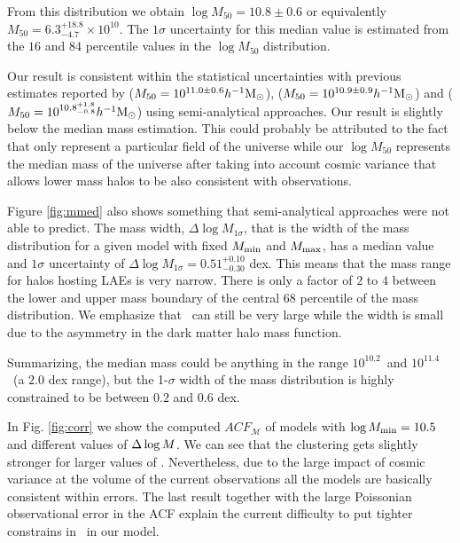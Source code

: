 \documentclass{emulateapj}
\newcommand{\hMsun}{{\ifmmode{h^{-1}{\rm {M_{\odot}}}}\else{$h^{-1}{\rm{M_{\odot}}}$}\fi}}
\newcommand{\mmin}{{\ifmmode{{M_{\rm min}}}\else{${M_{\rm min}}$}\fi}}
\newcommand{\mmax}{{\ifmmode{{M_{\rm max}}}\else{${M_{\rm max}}$}\fi}}
\newcommand{\lmmin}{{\ifmmode{{\log M_{\rm min}}}\else{${\log M_{\rm min}}$}\fi}}
\newcommand{\lmmax}{{\ifmmode{{\log M_{\rm max}}}\else{${\log M_{\rm max}}$}\fi}}
\newcommand{\dlm}{{\ifmmode{{\Delta \log M}}\else{$\Delta \log M$}\fi}}
\begin{document}
From this distribution we obtain $\log M_{50} = 10.8\pm 0.6$ or
equivalently $M_{50} = 6.3^{+18.8}_{-4.7}\times 10^{10}$\hMsun.  
The $1\sigma$ uncertainty for this median value is estimated from the
$16$ and $84$ percentile values in the $\log M_{50}$ distribution.  

Our result is consistent within the statistical uncertainties with
previous estimates reported by
 \citet{Bielby16} ($M_{50} = 10^{11.0\pm0.6} \hMsun$),
 \citet{Gawiser07} ($M_{50}= 10^{10.9\pm0.9} \hMsun$) and
 \citet{Ouchi2010} ($M_{50} = 10^{10.8^{+1.8}_{-0.8}} \hMsun$) 
using semi-analytical approaches.   Our result is slightly below the  \citet{Bielby16}
 median mass estimation. This could probably be attributed to the fact that  \citet{Bielby16}
only represent a particular field of the universe while our $\log M_{50}$  represents the
median mass of the universe after taking into account cosmic variance that allows lower mass 
halos to be also consistent with observations.



Figure \ref{fig:mmed} also shows something 
that semi-analytical approaches were not able to predict.
The mass width, $\Delta \log M_{1\sigma}$, that is the width of the mass
distribution for a given model with fixed $\mmin$ and $\mmax$, has a
median value and $1\sigma$ uncertainty of $\Delta \log M_{1\sigma} =
0.51^{+0.10}_{-0.30}$ dex.
This means that the mass range for halos hosting LAEs is very narrow.
There is only a factor of $2$ to $4$ between the lower and upper mass
boundary of the central 68 percentile of the mass distribution. 
We emphasize that \mmax\ can still be very large while the width is
small due to the asymmetry in the dark matter halo mass function. 


Summarizing, the median mass could be anything in the range
$10^{10.2}$\hMsun\ and $10^{11.4}$\hMsun\ (a $2.0$ dex range), 
but the 1-$\sigma$ width of the mass distribution is highly constrained 
to be between $0.2$ and $0.6$ dex.  


In Fig. \ref{fig:corr} we show the computed
$ACF_{\mathcal{M}}$ of models with $\lmmin=10.5$ and different values
of $\dlm$. We can see that the clustering gets slightly stronger for larger
values of \dlm. Nevertheless, due to the large impact of cosmic
variance at the volume of the current observations all the models  are
basically consistent within errors. The last result together with the
large Poissonian observational error in the ACF explain the current
difficulty to put tighter constrains in \lmmax\ in our model. 
\end{document}
